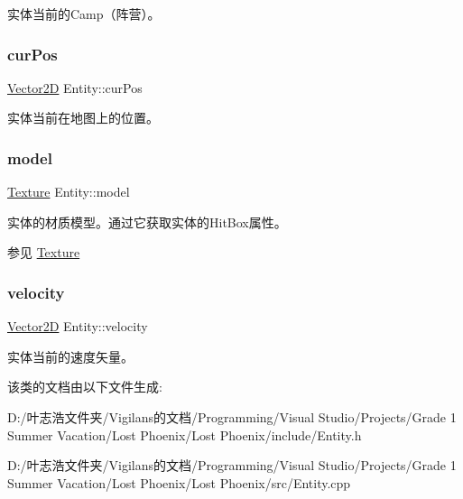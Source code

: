 实体当前的Camp（阵营）。 

\mbox{\label{class_entity_a5031aa6b058f2231daad16b35e3d536d}} 
\subsubsection{\texorpdfstring{cur\+Pos}{curPos}}
{\footnotesize\ttfamily \hyperlink{structbasic__vector2_d}{Vector2D} Entity\+::cur\+Pos\hspace{0.3cm}{\ttfamily [protected]}}



实体当前在地图上的位置。 

\mbox{\label{class_entity_a22ccba8fb86e5b4e10b2c33b6f56d238}} 
\subsubsection{\texorpdfstring{model}{model}}
{\footnotesize\ttfamily \hyperlink{struct_texture}{Texture} Entity\+::model\hspace{0.3cm}{\ttfamily [protected]}}



实体的材质模型。通过它获取实体的\+Hit\+Box属性。\begin{DoxySeeAlso}{参见}
\hyperlink{struct_texture}{Texture}


\end{DoxySeeAlso}


\mbox{\label{class_entity_a386d25b56772b8913eb3e5adc636f6e0}} 
\subsubsection{\texorpdfstring{velocity}{velocity}}
{\footnotesize\ttfamily \hyperlink{structbasic__vector2_d}{Vector2D} Entity\+::velocity\hspace{0.3cm}{\ttfamily [protected]}}



实体当前的速度矢量。 



该类的文档由以下文件生成\+:\begin{DoxyCompactItemize}
\item 
D\+:/叶志浩文件夹/\+Vigilans的文档/\+Programming/\+Visual Studio/\+Projects/\+Grade 1 Summer Vacation/\+Lost Phoenix/\+Lost Phoenix/include/Entity.\+h\item 
D\+:/叶志浩文件夹/\+Vigilans的文档/\+Programming/\+Visual Studio/\+Projects/\+Grade 1 Summer Vacation/\+Lost Phoenix/\+Lost Phoenix/src/Entity.\+cpp\end{DoxyCompactItemize}
